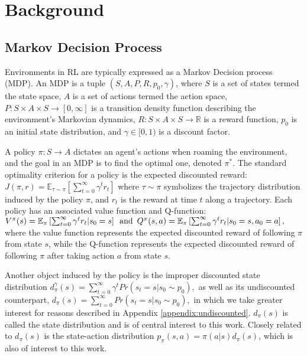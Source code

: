 \section{Background}

\subsection{Markov Decision Process}
Environments in RL are typically expressed as a Markov Decision process (MDP). An MDP is a tuple $(S,A,P,R,p_0,\gamma)$, where $S$ is a set of states termed the state space, $A$ is a set of actions termed the action space, $P: S \times A \times S \to [0,\infty]$ is a transition density function describing the environment's Markovian dynamics, $R: S\times A \times S \to \mathbb{R}$ is a reward function, $p_0$ is an initial state distribution, and $\gamma \in [0,1)$ is a discount factor. \par
A policy $\pi: S \to A$ dictates an agent's actions when roaming the environment, and the goal in an MDP is to find the optimal one, denoted $\pi^*$. The standard optimality criterion for a policy is the expected discounted reward:
$J(\pi,r) = \mathbb{E}_{\tau \sim \pi}\left[\sum_{t=0}^{\infty}\gamma^t r_t \right]$
where $\tau \sim \pi$ symbolizes the trajectory distribution induced by the policy $\pi$, and $r_t$ is the reward at time $t$ along a trajectory. Each policy has an associated value function and Q-function:
$V^\pi(s) = \mathbb{E}_\pi\left[\sum_{t=0}^{\infty}\gamma^t r_t | s_0 = s\right] \text{\, and \,}
Q^\pi(s,a)= \mathbb{E}_\pi\left[\sum_{t=0}^{\infty}\gamma^t r_t | s_0 = s, a_0 = a\right],$
where the value function represents the expected discounted reward of following $\pi$ from state $s$, while the Q-function represents the expected discounted reward of following $\pi$ after taking action $a$ from state $s$. 

Another object induced by the policy is the improper discounted state distribution $d^\gamma_{\pi}(s) = \sum_{t=0}^{\infty}\gamma^t Pr(s_t = s | s_0 \sim p_0),$ as well as its undiscounted counterpart, $d_{\pi}(s) = \sum_{t=0}^{\infty}Pr(s_t = s | s_0 \sim p_0),$ in which we take greater interest for reasons described in Appendix \ref{appendix:undiscounted}. $d_{\pi}(s)$ is called the state distribution and is of central interest to this work. Closely related to $d_\pi(s)$ is the state-action distribution $p_\pi(s,a) = \pi(a|s)d_\pi(s)$, which is also of interest to this work.


